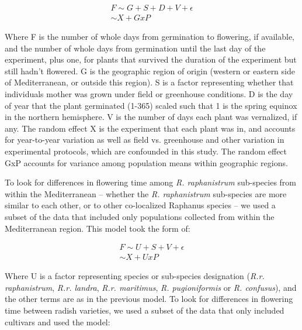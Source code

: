 \documentclass[twocolumn]{bmcart}%
\begin{document}
\begin{align}
F \sim G + S + D + V + \epsilon\\
%
%
%
\sim X + G x P  \nonumber
\end{align}


Where F is the number of whole days from germination to flowering, if available, and the number of whole days from germination until the last day of the experiment, plus one, for plants that survived the duration of the experiment but still hadn’t flowered. G is the geographic region of origin (western or eastern side of Mediterranean, or outside this region). S is a factor representing whether that individuals mother was grown under field or greenhouse conditions. D is the day of year that the plant germinated (1-365) scaled such that 1 is the spring equinox in the northern hemisphere. V is the number of days each plant was vernalized, if any.  The random effect X is the experiment that each plant was in, and accounts for year-to-year variation as well as field vs. greenhouse and other variation in experimental protocols, which are confounded in this study. The random effect GxP accounts for variance among population means within geographic regions.

To look for differences in flowering time among \textit{R. raphanistrum} sub-species from within the Mediterranean – whether the \textit{R. raphanistrum} sub-species are more similar to each other, or to other co-localized Raphanus species – we used a subset of the data that included only populations collected from within the Mediterranean region. This model took the form of:

\begin{align}
	F \sim U + S + V + \epsilon \\
	\sim X + U x P  \nonumber
\end{align}


Where U is a factor representing species or sub-species designation (\textit{R.r. raphanistrum}, \textit{R.r. landra}, \textit{R.r. maritimus}, \textit{R. pugioniformis} or \textit{R. confusus}), and the other terms are as in the previous model.
To look for differences in flowering time between radish varieties, we used a subset of the data that only included cultivars and used the model:
\end{document}
